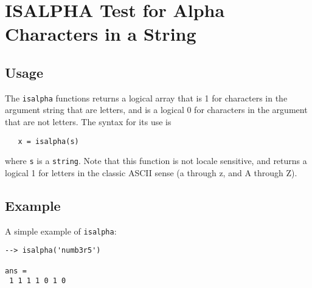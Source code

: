 \section{ISALPHA Test for Alpha Characters in a String}

\subsection{Usage}

The \verb|isalpha| functions returns a logical array that is 1 
for characters in the argument string that are letters, and 
is a logical 0 for characters in the argument that are not
letters.  The syntax for its use is
\begin{verbatim}
   x = isalpha(s)
\end{verbatim}
where \verb|s| is a \verb|string|.  Note that this function is not
locale sensitive, and returns a logical 1 for letters in the
classic ASCII sense (a through z, and A through Z).
\subsection{Example}

A simple example of \verb|isalpha|:
\begin{verbatim}
--> isalpha('numb3r5')

ans = 
 1 1 1 1 0 1 0 
\end{verbatim}
